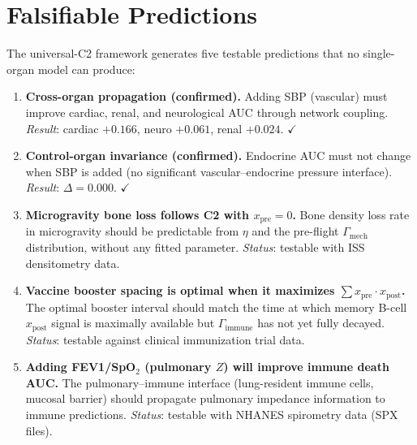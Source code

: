 \documentclass[aps,pre,twocolumn,superscriptaddress,floatfix]{revtex4-2}
\begin{document}
\section{Falsifiable Predictions}
\label{sec:predictions}

The universal-C2 framework generates five testable predictions
that no single-organ model can produce:

\begin{enumerate}
  \item \textbf{Cross-organ propagation (confirmed).}
    Adding SBP (vascular) must improve cardiac, renal,
    and neurological AUC through network coupling.
    \emph{Result}: cardiac $+0.166$, neuro $+0.061$,
    renal $+0.024$. $\checkmark$

  \item \textbf{Control-organ invariance (confirmed).}
    Endocrine AUC must not change when SBP is added
    (no significant vascular--endocrine pressure interface).
    \emph{Result}: $\Delta = 0.000$. $\checkmark$

  \item \textbf{Microgravity bone loss follows C2 with
    $x_{\text{pre}} = 0$.}
    Bone density loss rate in microgravity should be
    predictable from $\eta$ and the pre-flight
    $\Gamma_{\text{mech}}$ distribution, without
    any fitted parameter.
    \emph{Status}: testable with ISS densitometry data.

  \item \textbf{Vaccine booster spacing is optimal when it
    maximizes $\sum x_{\text{pre}} \cdot x_{\text{post}}$.}
    The optimal booster interval should match the
    time at which memory B-cell $x_{\text{post}}$ signal
    is maximally available but $\Gamma_{\text{immune}}$
    has not yet fully decayed.
    \emph{Status}: testable against clinical immunization
    trial data.

  \item \textbf{Adding FEV1/SpO$_2$ (pulmonary $Z$) will
    improve immune death AUC.}
    The pulmonary--immune interface (lung-resident immune
    cells, mucosal barrier) should propagate pulmonary
    impedance information to immune predictions.
    \emph{Status}: testable with NHANES spirometry data
    (SPX files).
\end{enumerate}


\end{document}
